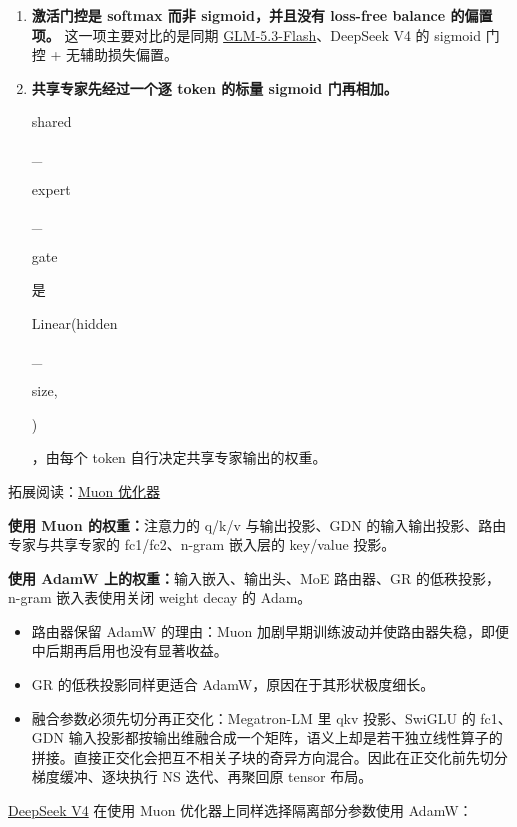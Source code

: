 \documentclass[zihao=false,fontset=windows]{ctexart}
\begin{document}
\begin{enumerate}
\item[\textcolor{feishuBlue}{1.}] \textcolor{feishuRed}{\textbf{激活门控是 softmax 而非 sigmoid，并且没有 loss-free balance 的偏置项。}} 这一项主要对比的是同期 \href{https://scnajei2ds6y.feishu.cn/wiki/KOBowKTbgiv6ewkHhEBc6qCNnPe}{GLM-5.3-Flash}、DeepSeek V4 的 sigmoid 门控 + 无辅助损失偏置。
\item[\textcolor{feishuBlue}{2.}] \textcolor{feishuRed}{\textbf{共享专家先经过一个逐 token 的标量 sigmoid 门再相加。}}{\setlength{\fboxsep}{0pt}\colorbox{inlinebg}{\strut\ttfamily shared}\colorbox{inlinebg}{\strut\ttfamily \_}\allowbreak{}\colorbox{inlinebg}{\strut\ttfamily expert}\colorbox{inlinebg}{\strut\ttfamily \_}\allowbreak{}\colorbox{inlinebg}{\strut\ttfamily gate}} 是 {\setlength{\fboxsep}{0pt}\colorbox{inlinebg}{\strut\ttfamily Linear(hidden}\colorbox{inlinebg}{\strut\ttfamily \_}\allowbreak{}\colorbox{inlinebg}{\strut\ttfamily size,} \colorbox{inlinebg}{\strut{})}}，由每个 token 自行决定共享专家输出的权重。
\end{enumerate}

\par\vspace{1.15em}\par\vspace{0.28em}
\begin{feishuquote}
拓展阅读：\href{https://my.feishu.cn/wiki/Hcj2wGTJEiohTikkdEKc7H4Nnlb}{Muon 优化器}

\end{feishuquote}
\textbf{使用 Muon 的权重：}注意力的 q/k/v 与输出投影、GDN 的输入输出投影、路由专家与共享专家的 fc1/fc2、n-gram 嵌入层的 key/value 投影。

\textbf{使用 AdamW 上的权重：}输入嵌入、输出头、MoE 路由器、GR 的低秩投影，n-gram 嵌入表使用关闭 weight decay 的 Adam。

\begin{itemize}
\item 路由器保留 AdamW 的理由：Muon 加剧早期训练波动并使路由器失稳，即便中后期再启用也没有显著收益。
\item GR 的低秩投影同样更适合 AdamW，原因在于其形状极度细长。
\item 融合参数必须先切分再正交化：Megatron-LM 里 qkv 投影、SwiGLU 的 fc1、GDN 输入投影都按输出维融合成一个矩阵，语义上却是若干独立线性算子的拼接。直接正交化会把互不相关子块的奇异方向混合。因此在正交化前先切分梯度缓冲、逐块执行 NS 迭代、再聚回原 tensor 布局。
\end{itemize}
\href{https://my.feishu.cn/wiki/UsuawakRYiqacxkD9vxcKzylnoe}{DeepSeek V4} 在使用 Muon 优化器上同样选择隔离部分参数使用 AdamW：
\end{document}
